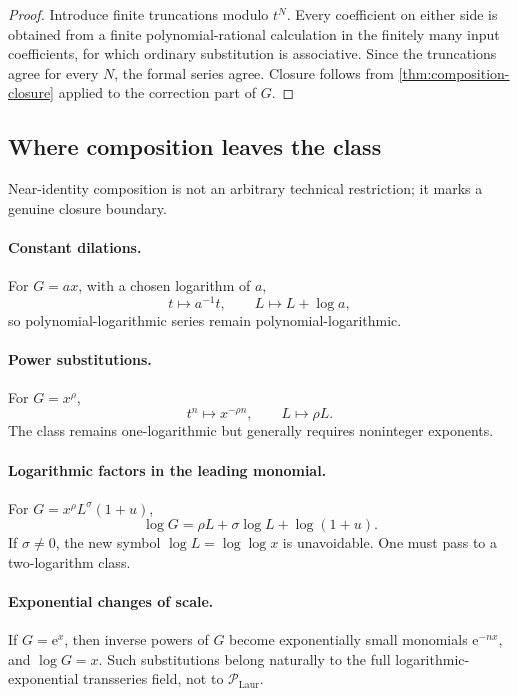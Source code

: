 \documentclass[11pt]{article}
\theoremstyle{pltheorem}
\newcommand{\PLL}{\mathscr P_{\mathrm{Laur}}}
\newcommand{\e}{\mathrm e}
\begin{document}
\begin{proof}
Introduce finite truncations modulo \(t^N\).  Every coefficient on either side is obtained from a finite polynomial-rational calculation in the finitely many input coefficients, for which ordinary substitution is associative.  Since the truncations agree for every \(N\), the formal series agree.  Closure follows from \cref{thm:composition-closure} applied to the correction part of \(G\).
\end{proof}

\subsection{Where composition leaves the class}

Near-identity composition is not an arbitrary technical restriction; it marks a genuine closure boundary.

\paragraph{Constant dilations.}
For \(G=ax\), with a chosen logarithm of \(a\),
\[
 t\mapsto a^{-1}t,
 \qquad
 L\mapsto L+\log a,
\]
so polynomial-logarithmic series remain polynomial-logarithmic.

\paragraph{Power substitutions.}
For \(G=x^\rho\),
\[
 t^n\mapsto x^{-\rho n},
 \qquad
 L\mapsto\rho L.
\]
The class remains one-logarithmic but generally requires noninteger exponents.

\paragraph{Logarithmic factors in the leading monomial.}
For
\(G=x^\rho L^\sigma(1+u)\),
\begin{equation}\label{eq:log-leading-log-factor}
 \log G=\rho L+\sigma\log L+\log(1+u).
\end{equation}
If \(\sigma\ne0\), the new symbol \(\log L=\log\log x\) is unavoidable.  One must pass to a two-logarithm class.

\paragraph{Exponential changes of scale.}
If \(G=\e^x\), then inverse powers of \(G\) become exponentially small monomials \(\e^{-nx}\), and \(\log G=x\).  Such substitutions belong naturally to the full logarithmic-exponential transseries field, not to \(\PLL\).
\end{document}
